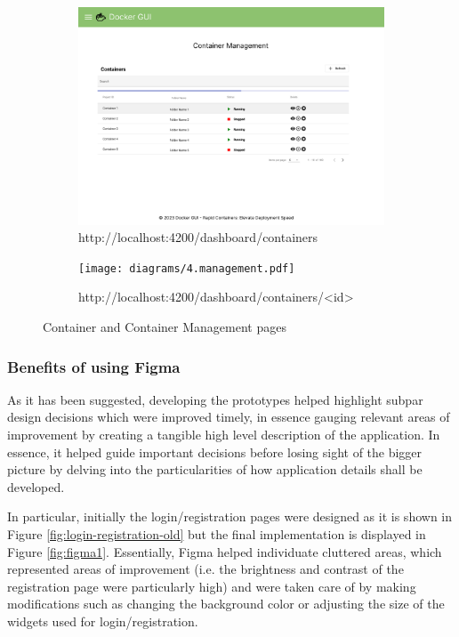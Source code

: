 \documentclass[multi, tikz, a4paper, oneside]{article}
\begin{document}
\begin{figure}[h]
  \centering
  \begin{subfigure}{.5\textwidth}
    \centering
    \includegraphics[width=0.95\linewidth]{diagrams/3.container.pdf}
    \caption{http://localhost:4200/dashboard/containers}
    \label{fig:sub1}
  \end{subfigure}%
  \begin{subfigure}{.5\textwidth}
    \centering
    \texttt{[image: diagrams/4.management.pdf]}
    \caption{http://localhost:4200/dashboard/containers/<id>}
    \label{fig:sub2}
  \end{subfigure}
  \caption{Container and Container Management pages}
  \label{fig:figma3}
\end{figure}


\subsubsection{Benefits of using Figma}
As it has been suggested, developing the prototypes helped highlight subpar
design decisions which were improved timely, in essence gauging relevant areas
of improvement by creating a tangible high level description of the application.
In essence, it helped guide important decisions before losing sight of the
bigger picture by delving into the particularities of how application details
shall be developed.

In particular, initially the login/registration pages were designed as it is
shown in Figure \ref{fig:login-registration-old} but the final implementation is
displayed in Figure \ref{fig:figma1}. Essentially, Figma helped individuate
cluttered areas, which represented areas of improvement (i.e. the brightness and
contrast of the registration page were particularly high) and were taken care of
by making modifications such as changing the background color or adjusting the
size of the widgets used for login/registration.
\end{document}
